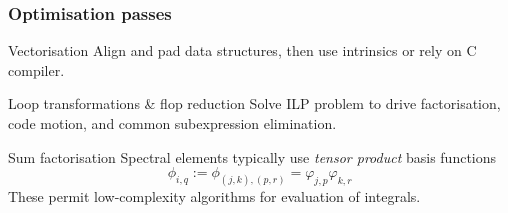 \documentclass[presentation]{beamer}
\begin{document}
\begin{frame}
  \frametitle{Optimisation passes}
  \begin{block}{Vectorisation}
    Align and pad data structures, then use intrinsics or rely on C
    compiler.
  \end{block}

  \begin{block}{Loop transformations \& flop reduction}
    Solve ILP problem to drive factorisation, code motion, and common
    subexpression elimination.
  \end{block}

  \begin{block}{Sum factorisation}
    Spectral elements typically use \emph{tensor product} basis functions
    \begin{equation*}
      \phi_{i,q} := \phi_{(j,k),(p,r)} = \varphi_{j,p}\varphi_{k,r}
    \end{equation*}
    These permit low-complexity algorithms for evaluation of integrals.
  \end{block}
\end{frame}
\end{document}
